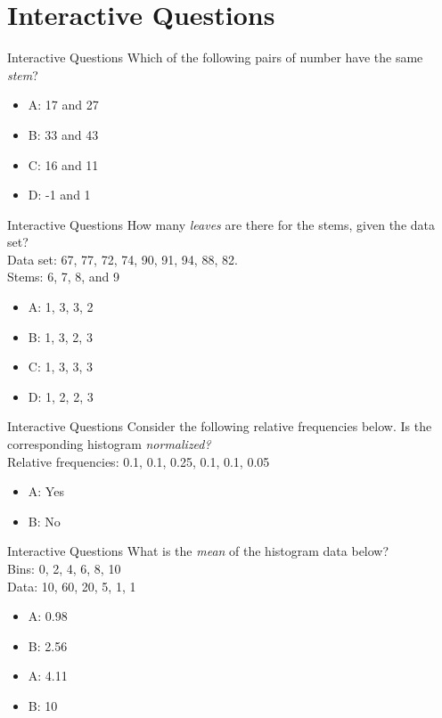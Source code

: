 \documentclass{beamer}
\begin{document}
\section{Interactive Questions}

\begin{frame}{Interactive Questions}
Which of the following pairs of number have the same \textit{stem}?
\begin{itemize}
\item A: 17 and 27
\item B: 33 and 43
\item C: 16 and 11
\item D: -1 and 1
\end{itemize}
\end{frame}

\begin{frame}{Interactive Questions}
How many \textit{leaves} are there for the stems, given the data set? \\
Data set: 67, 77, 72, 74, 90, 91, 94, 88, 82. \\
Stems: 6, 7, 8, and 9
\begin{itemize}
\item A: 1, 3, 3, 2
\item B: 1, 3, 2, 3
\item C: 1, 3, 3, 3
\item D: 1, 2, 2, 3
\end{itemize}
\end{frame}

\begin{frame}{Interactive Questions}
Consider the following relative frequencies below.  Is the corresponding histogram \textit{normalized?}\\
Relative frequencies: 0.1, 0.1, 0.25, 0.1, 0.1, 0.05
\begin{itemize}
\item A: Yes
\item B: No
\end{itemize}
\end{frame}

\begin{frame}{Interactive Questions}
What is the \textit{mean} of the histogram data below? \\
Bins: 0, 2, 4, 6, 8, 10 \\
Data: 10, 60, 20, 5, 1, 1
\begin{itemize}
\item A: 0.98
\item B: 2.56
\item A: 4.11
\item B: 10
\end{itemize}
\end{frame}
\end{document}

